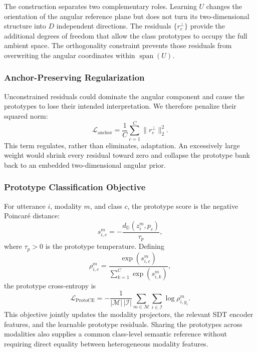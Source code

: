 \documentclass[letterpaper,journal]{IEEEtran}
\begin{document}
The construction separates two complementary roles. Learning \(U\) changes
the orientation of the angular reference plane but does not turn its
two-dimensional structure into \(D\) independent directions. The residuals
\(\{r_c^\perp\}\) provide the additional degrees of freedom that allow the
class prototypes to occupy the full ambient space. The orthogonality
constraint prevents those residuals from overwriting the angular coordinates
within \(\operatorname{span}(U)\).

\subsubsection{Anchor-Preserving Regularization}

Unconstrained residuals could dominate the angular component and cause
the prototypes to lose their intended interpretation. We therefore penalize
their squared norm:
\begin{equation}
    \mathcal{L}_{\mathrm{anchor}}
    =\frac{1}{C}\sum_{c=1}^{C}
    \lVert r_c^\perp\rVert_2^2.
    \label{eq:rgrpl_anchor_loss}
\end{equation}
This term regulates, rather than eliminates, adaptation. An excessively large
weight would shrink every residual toward zero and collapse the prototype
bank back to an embedded two-dimensional angular prior.

\subsubsection{Prototype Classification Objective}

For utterance \(i\), modality \(m\), and class \(c\), the prototype score is
the negative Poincar\'e distance:
\begin{equation}
    s_{i,c}^{m}
    =-\frac{d_{\mathbb{D}}(z_i^m,p_c)}{\tau_p},
    \label{eq:rgrpl_prototype_score}
\end{equation}
where \(\tau_p>0\) is the prototype temperature. Defining
\begin{equation}
    \rho_{i,c}^{m}
    =\frac{\exp(s_{i,c}^{m})}
    {\sum_{k=1}^{C}\exp(s_{i,k}^{m})},
    \label{eq:rgrpl_prototype_probability}
\end{equation}
the prototype cross-entropy is
\begin{equation}
    \mathcal{L}_{\mathrm{ProtoCE}}
    =-\frac{1}{|\mathcal{M}|\,|\mathcal{I}|}
    \sum_{m\in\mathcal{M}}\sum_{i\in\mathcal{I}}
    \log\rho_{i,y_i}^{m}.
    \label{eq:rgrpl_prototype_ce}
\end{equation}
This objective jointly updates the modality projectors, the relevant SDT
encoder features, and the learnable prototype residuals. Sharing the
prototypes across modalities also supplies a common class-level semantic
reference without requiring direct equality between heterogeneous modality
features.
\end{document}
